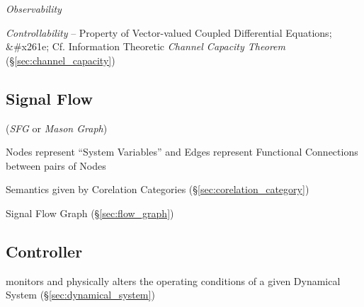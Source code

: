\emph{Observability}

\emph{Controllability} -- Property of Vector-valued Coupled
Differential Equations; &#x261e; Cf. Information Theoretic
\emph{Channel Capacity Theorem} (\S\ref{sec:channel_capacity})



\subsection{Signal Flow}\label{sec:signal_flow}

(\emph{SFG} or \emph{Mason Graph})

Nodes represent ``System Variables'' and Edges represent Functional
Connections between pairs of Nodes


Semantics given by Corelation Categories
(\S\ref{sec:corelation_category})

Signal Flow Graph (\S\ref{sec:flow_graph})



\subsection{Controller}\label{sec:controller}


monitors and physically alters the operating conditions of a given
Dynamical System (\S\ref{sec:dynamical_system})
